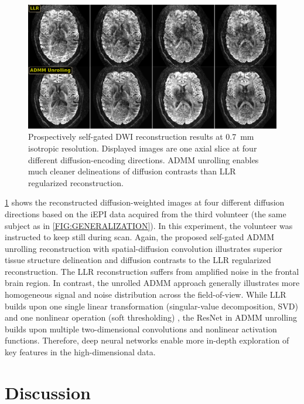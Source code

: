 \documentclass[AMA,STIX2COL,Linenumberson]{MRM}
\begin{document}
\begin{figure}
	\includegraphics[width=\textwidth]{./figures/fig8.png}
	\caption{Prospectively self-gated DWI reconstruction results
		at \SI{0.7}{mm} isotropic resolution. Displayed images are
		one axial slice at four different diffusion-encoding directions.
		ADMM unrolling enables much cleaner delineations of diffusion contrasts
		than LLR regularized reconstruction.}
	\label{FIG:SG_ZSSSL_VOL3}
\end{figure}

\cref{FIG:SG_ZSSSL_VOL3} shows the reconstructed diffusion-weighted images
at four different diffusion directions based on the iEPI data
acquired from the third volunteer
(the same subject as in \cref{FIG:GENERALIZATION}).
In this experiment, the volunteer was instructed
to keep still during scan.
Again, the proposed self-gated ADMM unrolling reconstruction
with spatial-diffusion convolution illustrates
superior tissue structure delineation and
diffusion contrasts
to the LLR regularized reconstruction.
The LLR reconstruction suffers from
amplified noise in the frontal brain region.
In contrast, the unrolled ADMM approach generally illustrates
more homogeneous signal and noise distribution
across the field-of-view.
While LLR builds upon one single linear transformation
(singular-value decomposition, SVD) and
one nonlinear operation (soft thresholding) \cite{cai_2010_svt},
the ResNet in ADMM unrolling builds upon
multiple two-dimensional convolutions and nonlinear activation functions.
Therefore, deep neural networks enable more in-depth exploration
of key features in the high-dimensional data.

\section{Discussion}\label{SEC:DISC}
\end{document}
